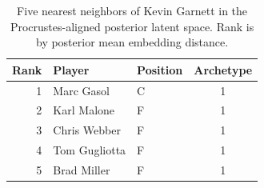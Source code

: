 \begin{table}[htbp]
  \centering\small
  \begin{tabular}{rllc}
    \toprule
    Rank & Player & Position & Archetype \\
    \midrule
    1 & Marc Gasol & C & 1 \\
    2 & Karl Malone & F & 1 \\
    3 & Chris Webber & F & 1 \\
    4 & Tom Gugliotta & F & 1 \\
    5 & Brad Miller & F & 1 \\
    \bottomrule
  \end{tabular}
  \caption{Five nearest neighbors of Kevin Garnett in the Procrustes-aligned posterior latent space. Rank is by posterior mean embedding distance.}
  \label{tab:Kevin_Garnett_neighbors}
\end{table}

